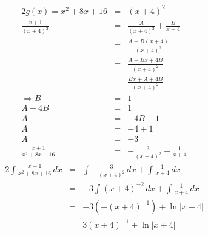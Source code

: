 \documentclass[10pt,a4paper,oneside,ngerman,numbers=noenddot]{scrartcl}
\begin{document}
\subsection{} %
\begin{alignat*}{2}
g(x) = x^{2} + 8x + 16 &=& (x+4)^{2} \\
\frac{x+1}{(x+4)^{2}} &=& \frac{A}{(x+4)^{2}} + \frac{B}{x+4} \\
&=& \frac{A + B(x+4)}{(x+4)^{2}} \\
&=& \frac{A + Bx + 4B}{(x+4)^{2}} \\
&=& \frac{Bx + A + 4B}{(x+4)^{2}} \\
\Rightarrow B &=&1 \\
A + 4B &=& 1 \\
A &=& -4B + 1 \\
A &=& -4 + 1 \\
A &=& -3 \\
\frac{x+1}{x^{2}+8x+16} &=& -\frac{3}{(x+4)^{2}} + \frac{1}{x+4}
\end{alignat*}
\begin{alignat*}{2}
\int \frac{x+1}{x^{2}+8x+16} \,dx &=& \int -\frac{3}{(x+4)^{2}}\,dx + \int \frac{1}{x+4}\,dx \\
&=& -3\int (x+4)^{-2}\,dx + \int \frac{1}{x+4}\,dx \\
&=& -3\left(-(x+4)^{-1}\right)+ \ln |x+4| \\
&=& 3(x+4)^{-1} + \ln |x+4|
\end{alignat*}
\end{document}

